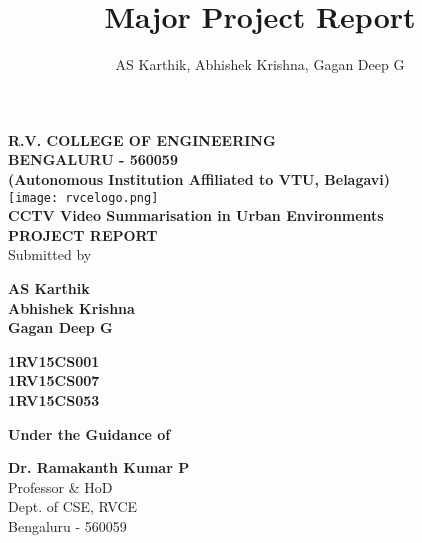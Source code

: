 \title{Major Project Report}
\author{AS Karthik, Abhishek Krishna, Gagan Deep G}


\begin{center}
	\textbf {
		\Large R.V. COLLEGE OF ENGINEERING\\
		\Large BENGALURU - 560059\\
		\small(Autonomous Institution Affiliated to VTU, Belagavi)\\[1cm]
	}
	\texttt{[image: rvcelogo.png]}\\[1cm]
	\Large \textbf{CCTV Video Summarisation in Urban Environments}\\[1cm]
	\large \textbf{PROJECT REPORT} \\[0.5cm]
	\normalsize Submitted by\\

	\begin{multicols}{2}
		\begin{flushright}
			\large \textbf{AS Karthik}\\
			\large \textbf{Abhishek Krishna}\\
			\large \textbf{Gagan Deep G}
		\end{flushright}

		\columnbreak

		\begin{flushleft}
			\large \textbf{1RV15CS001}\\
			\large \textbf{1RV15CS007}\\
			\large \textbf{1RV15CS053}
		\end{flushleft}
	\end{multicols}

	\bigskip

	\normalsize \textbf{Under the Guidance of}\\

	\begin{multicols}{2}

		\normalsize \textbf{Dr. Ramakanth Kumar P}\\
		\normalsize Professor \& HoD\\
		\normalsize Dept. of CSE, RVCE\\
		\normalsize Bengaluru - 560059\\


\end{multicols}
\end{center}

